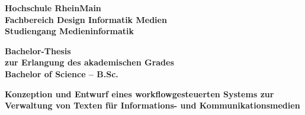 \setmainfont[Mapping=tex-text]{Museo Sans}

\setlength\fboxsep{0pt}
\setlength\fboxrule{0.5pt}




\begin{center}

\begin{small}

\textbf{Hochschule RheinMain\\Fachbereich Design Informatik Medien\\Studiengang Medieninformatik}

\vspace{1cm}

\textbf{Bachelor-Thesis\\zur Erlangung des akademischen Grades\\Bachelor of Science – B.Sc.}

\end{small}

\vspace{2cm}

\begin{huge}

\textbf{Konzeption und Entwurf eines workflowgesteuerten Systems zur Verwaltung von Texten für Informations- und Kommunikationsmedien}

\end{huge}

\end{center}

\setmainfont[Mapping=tex-text,BoldFont={Vollkorn-Bold},ItalicFont={Vollkorn-Italic},BoldItalicFont={Vollkorn-Bold Italic}]{Vollkorn}
\setsansfont[Mapping=tex-text]{Museo Sans}
